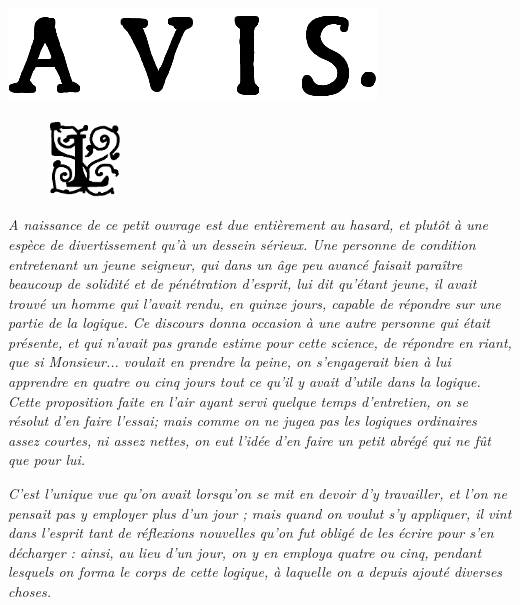 \section*{}
\begin{center}
	\includegraphics[scale=0.23]{images/titre-avis.png}
\end{center}

\begin{figure}
    \includegraphics[width=0.17\textwidth]{images/enluminure_L1.png}
\end{figure}
\noindent{}\emph{ A naissance de ce petit ouvrage est due entièrement au hasard, et plutôt à une espèce de divertissement qu'à un dessein sérieux. Une personne de condition entretenant un jeune seigneur, qui dans un âge peu avancé faisait paraître beaucoup de solidité et de pénétration d'esprit, lui dit qu'étant jeune, il avait trouvé un homme qui l'avait rendu, en quinze jours, capable de répondre sur une partie de la logique. Ce discours donna occasion à une autre personne qui était présente, et qui n'avait pas grande estime pour cette science, de répondre en riant, que si Monsieur... voulait en prendre la peine, on s'engagerait bien à lui apprendre en quatre ou cinq jours tout ce qu'il y avait d'utile dans la logique. Cette proposition faite en l'air ayant servi quelque temps d'entretien, on se résolut d'en faire l'essai; mais comme on ne jugea pas les logiques ordinaires assez courtes, ni assez nettes, on eut l'idée d'en faire un petit abrégé qui ne fût que pour lui.}

\emph{C'est l'unique vue qu'on avait lorsqu'on se mit en devoir d'y travailler, et l'on ne pensait pas y employer plus d'un jour ; mais quand on voulut s'y appliquer, il vint dans l'esprit tant de réflexions nouvelles qu'on fut obligé de les écrire pour s'en décharger : ainsi, au lieu d'un jour, on y en employa quatre ou cinq, pendant lesquels on forma le corps de cette logique, à laquelle on a depuis ajouté diverses choses.}

